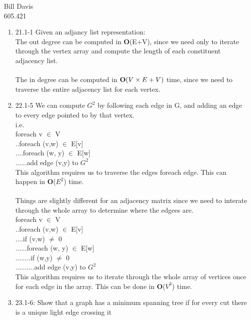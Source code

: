 \documentclass[11pt,fleqn]{article}
\begin{document}
\newcommand{\mbf}[1]{\mbox{{\bfseries #1}}}
\newcommand{\N}{\mbf{N}}
\renewcommand{\O}{\mbf{O}}

\noindent Bill Davis \\
605.421 

\begin{enumerate}
\item 
21.1-1 Given an adjancy list representation: \\
The out degree can be computed in \O(E+V), since we need only to iterate through the vertex array
and compute the length of each constituent adjacency list.  \\
\\
The in degree can be computed in $\O(V \times E + V)$ time, since we need to traverse the entire adjacency list for each vertex. 

\item
22.1-5 We can compute $G^{2}$ by following each edge in G, and adding an edge to every edge pointed to by that vertex. \\
i.e.\\
foreach v $\in$ V          \\
..foreach (v,w) $\in$ E[v]   \\
....foreach (w, y) $\in$ E[w]  \\
......add edge (v,y) to $G^{2}$ \\
This algorithm requires us to traverse the edges foreach edge. This can happen in \O($E^{2}$) time. \\
\\
Things are slightly different for an adjacency matrix since we need to interate through the whole array to determine where the edgees are. \\
foreach v $\in$ V          \\
..foreach (v,w) $\in$ E[v]   \\
....if (v,w) $\ne$ 0           \\
......foreach (w, y) $\in$ E[w]  \\ 
........if (w,y) $\ne$ 0            \\
..........add edge (v,y) to $G^{2}$ \\

This algorithm requires us to iterate through the whole array of vertices once for each edge in the array. 
This can be done in \O($V^{3} $) time. 


\item
23.1-6: Show that a graph has a minimum spanning tree if for every 
        cut there is a unique light edge crossing it \\


\end{enumerate}
\end{document}
